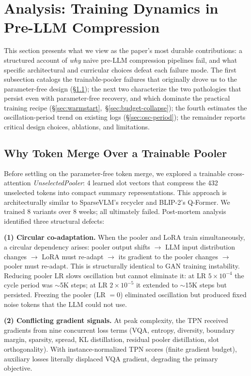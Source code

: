 \documentclass{article}
\begin{document}
\section{Analysis: Training Dynamics in Pre-LLM Compression}
\label{sec:discussion}

This section presents what we view as the paper's most durable
contributions: a structured account of \emph{why} naive pre-LLM
compression pipelines fail, and what specific architectural and
curricular choices defeat each failure mode. The first subsection
catalogs the trainable-pooler failures that originally drove us to
the parameter-free design (\S\ref{sec:pooler-failures}); the next two
characterize the two pathologies that persist even with parameter-free
recovery, and which dominate the practical training recipe
(\S\ref{sec:warmstart},~\S\ref{sec:budget-collapse}); the fourth
estimates the oscillation-period trend on existing logs
(\S\ref{sec:osc-period}); the remainder reports critical design
choices, ablations, and limitations.

\subsection{Why Token Merge Over a Trainable Pooler}
\label{sec:pooler-failures}

Before settling on the parameter-free token merge, we explored a trainable
cross-attention \emph{UnselectedPooler}: 4 learned slot vectors that compress the
432 unselected tokens into compact summary representations.
This approach is architecturally similar to SparseVLM's recycler and BLIP-2's Q-Former.
We trained 8 variants over 8 weeks; all ultimately failed.
Post-mortem analysis identified three structural defects:

\textbf{(1) Circular co-adaptation.}
When the pooler and LoRA train simultaneously, a circular dependency arises:
pooler output shifts $\to$ LLM input distribution changes $\to$ LoRA must re-adapt
$\to$ its gradient to the pooler changes $\to$ pooler must re-adapt.
This is structurally identical to GAN training instability.
Reducing pooler LR slows oscillation but cannot eliminate it:
at LR $5\times10^{-4}$ the cycle period was $\sim$5K steps;
at LR $2\times10^{-5}$ it extended to $\sim$15K steps but persisted.
Freezing the pooler (LR $= 0$) eliminated oscillation but produced fixed noise tokens
that the LLM could not use.

\textbf{(2) Conflicting gradient signals.}
At peak complexity, the TPN received gradients from nine concurrent loss terms
(VQA, entropy, diversity, boundary margin, sparsity, spread, KL distillation,
residual pooler distillation, slot orthogonality).
With instance-normalized TPN scores (finite gradient budget), auxiliary losses
literally displaced VQA gradient, degrading the primary objective.
\end{document}
